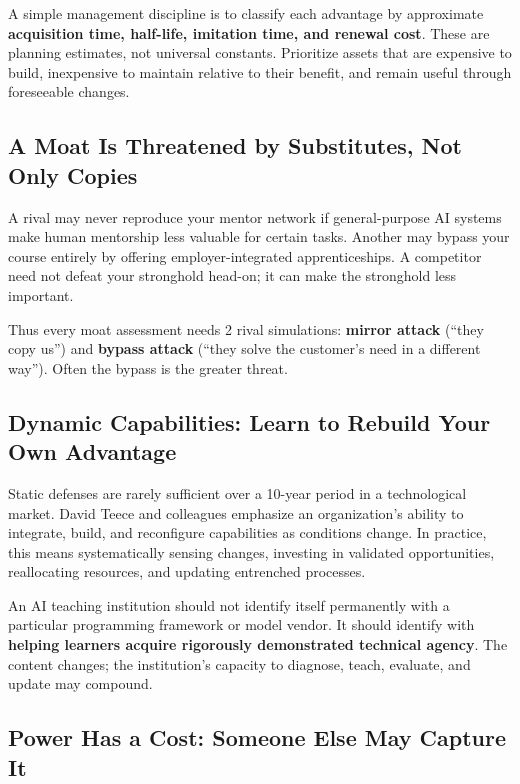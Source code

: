 A simple management discipline is to classify each advantage by approximate \textbf{acquisition time, half-life, imitation time, and renewal cost}. These are planning estimates, not universal constants. Prioritize assets that are expensive to build, inexpensive to maintain relative to their benefit, and remain useful through foreseeable changes.

\subsection{A Moat Is Threatened by Substitutes, Not Only Copies}
\label{sec:moat_threatened_by_substitutes}

A rival may never reproduce your mentor network if general-purpose AI systems make human mentorship less valuable for certain tasks. Another may bypass your course entirely by offering employer-integrated apprenticeships. A competitor need not defeat your stronghold head-on; it can make the stronghold less important.

Thus every moat assessment needs 2 rival simulations: \textbf{mirror attack} (``they copy us'') and \textbf{bypass attack} (``they solve the customer's need in a different way''). Often the bypass is the greater threat.

\subsection{Dynamic Capabilities: Learn to Rebuild Your Own Advantage}
\label{sec:dynamic_capabilities_rebuild_advantage}

Static defenses are rarely sufficient over a 10-year period in a technological market. David Teece and colleagues emphasize an organization's ability to integrate, build, and reconfigure capabilities as conditions change. In practice, this means systematically sensing changes, investing in validated opportunities, reallocating resources, and updating entrenched processes.

An AI teaching institution should not identify itself permanently with a particular programming framework or model vendor. It should identify with \textbf{helping learners acquire rigorously demonstrated technical agency}. The content changes; the institution's capacity to diagnose, teach, evaluate, and update may compound.

\subsection{Power Has a Cost: Someone Else May Capture It}
\label{sec:power_cost_capture}

